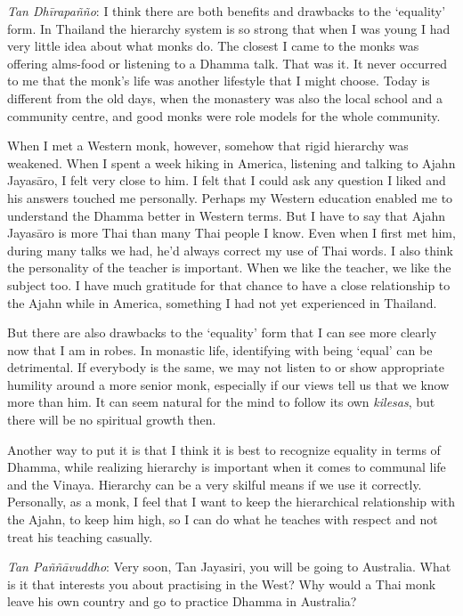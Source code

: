 \emph{Tan Dhīrapañño}: I think there are both benefits and drawbacks to
the `equality' form. In Thailand the hierarchy system is so strong that
when I was young I had very little idea about what monks do. The closest
I came to the monks was offering alms-food or listening to a Dhamma
talk. That was it. It never occurred to me that the monk's life was
another lifestyle that I might choose. Today is different from the old
days, when the monastery was also the local school and a community
centre, and good monks were role models for the whole community. 

When I met a Western monk, however, somehow that rigid hierarchy was
weakened. When I spent a week hiking in America, listening and talking
to Ajahn Jayasāro, I felt very close to him. I felt that I could ask any
question I liked and his answers touched me personally. Perhaps my
Western education enabled me to understand the Dhamma better in Western
terms. But I have to say that Ajahn Jayasāro is more Thai than many Thai
people I know. Even when I first met him, during many talks we had, he'd
always correct my use of Thai words. I also think the personality of the
teacher is important. When we like the teacher, we like the subject too. 
I have much gratitude for that chance to have a close relationship to
the Ajahn while in America, something I had not yet experienced in
Thailand. 

But there are also drawbacks to the `equality' form that I can see more
clearly now that I am in robes. In monastic life, identifying with being
`equal' can be detrimental. If everybody is the same, we may not listen
to or show appropriate humility around a more senior monk, especially if
our views tell us that we know more than him. It can seem natural for
the mind to follow its own \emph{kilesas}, but there will be no
spiritual growth then.

Another way to put it is that I think it is best
to recognize equality in terms of Dhamma, while realizing hierarchy is
important when it comes to communal life and the Vinaya. Hierarchy can
be a very skilful means if we use it correctly. Personally, as a monk, I
feel that I want to keep the hierarchical relationship with the Ajahn, 
to keep him high, so I can do what he teaches with respect and not treat
his teaching casually. 

\emph{Tan Paññāvuddho}: Very soon, Tan Jayasiri, you will be going to
Australia. What is it that interests you about practising in the West? 
Why would a Thai monk leave his own country and go to practice Dhamma in
Australia? 

